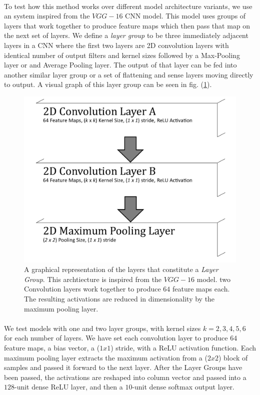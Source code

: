 \documentclass[12pt,letterpaper]{article}
\begin{document}
\paragraph*{}To test how this method works over different model architecture variants, we use an system inspired from the $VGG-16$ CNN model. This model uses groups of layers that work together to produce feature maps which then pass that map on the next set of layers. We define a \textit{layer group} to be three immediately adjacent layers in a CNN where the first two layers are 2D convolution layers with identical number of output filters and kernel sizes followed by a Max-Pooling layer or and Average Pooling layer. The output of that layer can be fed into another similar layer group or a set of flattening and sense layers moving directly to output. A visual graph of this layer group can be seen in fig. (\ref{Layer Group}).

\begin{figure}[h]
\label{Layer Group}
\begin{center}
\includegraphics[scale=0.5]{CNN_LayerGroup}
\end{center}
\caption{A graphical representation of the layers that constitute a \textit{Layer Group}. This archtiecture is inspired from the $VGG-16$ model. two Convolution layers work together to produce $64$ feature maps each. The resulting activations are reduced in dimensionality by the maximum pooling layer.}
\end{figure}

\paragraph*{}We test models with one and two layer groups, with kernel sizes $k = 2,3,4,5,6$ for each number of layers. We have set each convolution layer to produce $64$ feature maps, a bias vector, a ($1 x 1$) stride, with a ReLU activation function. Each maximum pooling layer extracts the maximum activation from a ($2 x 2$) block of samples and passed it forward to the next layer. After the Layer Groups have been passed, the activations are reshaped into column vector and passed into a $128$-unit dense ReLU layer, and then a $10$-unit dense softmax output layer.
\end{document}
